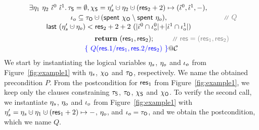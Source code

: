 \[{{\begin{array}{c}
{\begin{array}{c}
\exists \gist_1~\gist_2~\iknh^0~\iknh^1 \ldot     
%
\tkns = \emptyset \aand 
\hists = \gists' \hunion \gist_2 \hunion (\res_2 + 2)\mapsto (\iknh^0, \iknh^1, -)\aand\hbox{}\\[2pt] 
  \ikno \subseteq \tkno \hunion (\Tomb~\histo \setminus \Tomb~\gisto),  \\[1pt]
    \last~(\gists' \hunion \gisto) < \res_2 + 2 + 2 \ (|\iknh^0 \cap \ikno^0|\!+\!|\iknh^1 \cap
    \ikno^1|) 
\end{array}
\!\!\!\!\!}~\comm{Q}
\\\\[-7pt]
~~~~~~~~~~~~~~~~~~~~~~~~~~\kw{return}~(\res_1, \res_2); ~\comm{\res = (\res_1, \res_2)}
\\[2pt]
\spec{~Q(\res.1/\res_1, \res.2/\res_2)~}@\ccon
\end{array}
}} 
\]
%
We start by instantiating the logical variables $\eta_s$, $\eta_o$ and
$\iota_o$ from Figure~\ref{fig:example1} with $\eta_s$, $\chi_{\mathsf{O}}$ and
$\tau_{\mathsf{O}}$, respectively. We name the obtained precondition $P$.
%
From the postcondition for $\mathsf{res}_1$ from Figure~\ref{fig:example1}, we
keep only the clauses constraining $\tau_{\mathsf{S}}$, $\tau_{\mathsf{O}}$, $\chi_{\mathsf{S}}$ and
$\chi_{\mathsf{O}}$. To verify the second call, we instantiate $\eta_s$,
$\eta_o$ and $\iota_o$ from Figure~\ref{fig:example1} with $\gists' =
\gists \hunion \gist_1 \hunion (\res_1 + 2)\mapsto -$, $\eta_o$, and
$\iota_o = \tau_{\mathsf{O}}$, and we obtain the postcondition, which we name $Q$.


